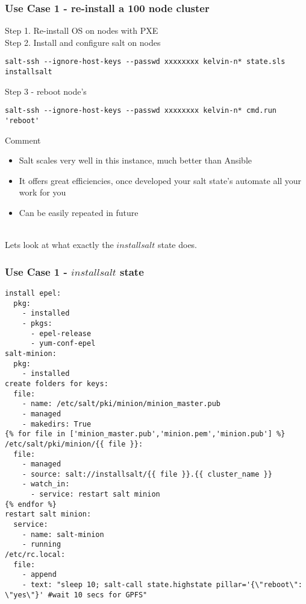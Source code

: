 \documentclass{beamer}
\begin{document}
\begin{frame}[fragile] %
\frametitle{Use Case 1 - re-install a 100 node cluster}

Step 1. Re-install OS on nodes with PXE \\
Step 2. Install and configure salt on nodes\\
\begin{lstlisting}[basicstyle=\tiny,]
salt-ssh --ignore-host-keys --passwd xxxxxxxx kelvin-n* state.sls installsalt
\end{lstlisting}
Step 3 - reboot node's\\
\begin{lstlisting}[basicstyle=\tiny,]
salt-ssh --ignore-host-keys --passwd xxxxxxxx kelvin-n* cmd.run 'reboot' 
\end{lstlisting}
Comment\\
\begin{itemize}
\item Salt scales very well in this instance, much better than Ansible
\item It offers great efficiencies, once developed your salt state's automate all your work for you
\item Can be easily repeated in future\\~\\
\end{itemize}
Lets look at what exactly the $installsalt$ state does.
\end{frame}


\begin{frame}[fragile]
\frametitle{Use Case 1 - $installsalt$ state}
\begin{lstlisting}[basicstyle=\tiny,]
install epel:
  pkg:
    - installed
    - pkgs:
      - epel-release
      - yum-conf-epel
salt-minion:
  pkg:
    - installed
create folders for keys:
  file:
    - name: /etc/salt/pki/minion/minion_master.pub
    - managed
    - makedirs: True
{% for file in ['minion_master.pub','minion.pem','minion.pub'] %}
/etc/salt/pki/minion/{{ file }}:
  file:
    - managed
    - source: salt://installsalt/{{ file }}.{{ cluster_name }}
    - watch_in:
      - service: restart salt minion
{% endfor %}
restart salt minion:
  service:
    - name: salt-minion
    - running
/etc/rc.local:
  file:
    - append
    - text: "sleep 10; salt-call state.highstate pillar='{\"reboot\": \"yes\"}' #wait 10 secs for GPFS"
\end{lstlisting}
\end{frame}
\end{document}
